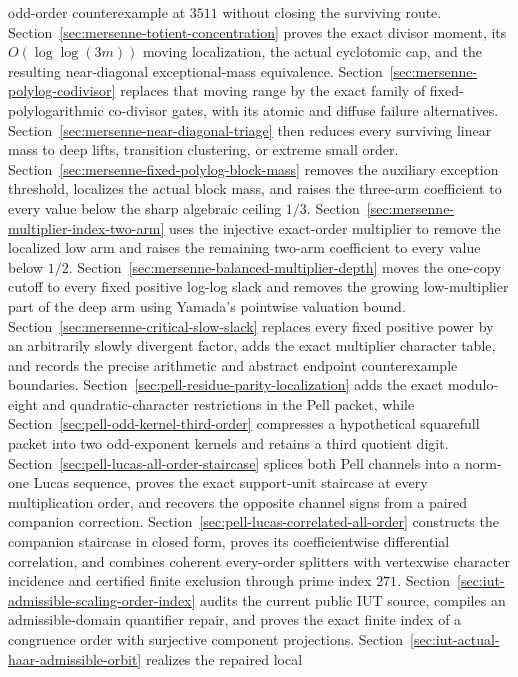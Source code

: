 \documentclass[11pt]{amsart}
\theoremstyle{definition}
\theoremstyle{remark}
\begin{document}
odd-order counterexample at $3511$ without closing the surviving route.
Section~\ref{sec:mersenne-totient-concentration} proves the exact divisor
moment, its $O(\log\log(3m))$ moving localization, the actual cyclotomic cap,
and the resulting near-diagonal exceptional-mass equivalence.
Section~\ref{sec:mersenne-polylog-codivisor} replaces that moving range by
the exact family of fixed-polylogarithmic co-divisor gates, with its atomic
and diffuse failure alternatives.  Section~\ref{sec:mersenne-near-diagonal-triage}
then reduces every surviving linear mass to deep lifts, transition
clustering, or extreme small order.
Section~\ref{sec:mersenne-fixed-polylog-block-mass} removes the auxiliary
exception threshold, localizes the actual block mass, and raises the
three-arm coefficient to every value below the sharp algebraic ceiling
$1/3$.  Section~\ref{sec:mersenne-multiplier-index-two-arm} uses the injective
exact-order multiplier to remove the localized low arm and raises the
remaining two-arm coefficient to every value below $1/2$.
Section~\ref{sec:mersenne-balanced-multiplier-depth} moves the one-copy cutoff
to every fixed positive log-log slack and removes the growing low-multiplier
part of the deep arm using Yamada's pointwise valuation bound.
Section~\ref{sec:mersenne-critical-slow-slack} replaces every fixed positive
power by an arbitrarily slowly divergent factor, adds the exact multiplier
character table, and records the precise arithmetic and abstract endpoint
counterexample boundaries.
Section~\ref{sec:pell-residue-parity-localization} adds the exact modulo-eight
and quadratic-character restrictions in the Pell packet, while
Section~\ref{sec:pell-odd-kernel-third-order} compresses a hypothetical
squarefull packet into two odd-exponent kernels and retains a third quotient
digit.
Section~\ref{sec:pell-lucas-all-order-staircase} splices both Pell channels
into a norm-one Lucas sequence, proves the exact support-unit staircase at
every multiplication order, and recovers the opposite channel signs from a
paired companion correction.
Section~\ref{sec:pell-lucas-correlated-all-order} constructs the companion
staircase in closed form, proves its coefficientwise differential correlation,
and combines coherent every-order splitters with vertexwise character
incidence and certified finite exclusion through prime index $271$.
Section~\ref{sec:iut-admissible-scaling-order-index} audits the current public
IUT source, compiles an admissible-domain quantifier repair, and proves the
exact finite index of a congruence order with surjective component projections.
Section~\ref{sec:iut-actual-haar-admissible-orbit} realizes the repaired local
\end{document}
